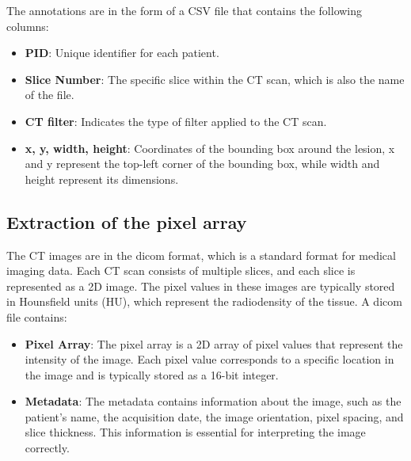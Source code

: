The annotations are in the form of a CSV file that contains the following columns:
\begin{itemize}
    \item \textbf{PID}: Unique identifier for each patient.
    \item \textbf{Slice Number}: The specific slice within the CT scan, which is also the name of the file.
    \item \textbf{CT filter}: Indicates the type of filter applied to the CT scan.
    \item \textbf{x, y, width, height}: Coordinates of the bounding box around the lesion, x and y represent the top-left corner of the bounding box, while width and height represent its dimensions.
\end{itemize}

\subsection{Extraction of the pixel array}
The CT images are in the dicom format, which is a standard format for medical imaging data. Each CT scan consists of multiple slices, and each slice is represented as a 2D image. The pixel values in these images are typically stored in Hounsfield units (HU), which represent the radiodensity of the tissue.
A dicom file contains:
\begin{itemize}
    \item \textbf{Pixel Array}: The pixel array is a 2D array of pixel values that represent the intensity of the image. Each pixel value corresponds to a specific location in the image and is typically stored as a 16-bit integer.
    \item \textbf{Metadata}: The metadata contains information about the image, such as the patient's name, the acquisition date, the image orientation, pixel spacing, and slice thickness. This information is essential for interpreting the image correctly.
\end{itemize}


